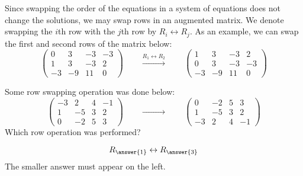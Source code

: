 \documentclass{ximera}
\begin{document}
Since swapping the order of the equations in a
system of equations does not change the solutions, we may swap rows
in an augmented matrix. We denote swapping the $i$th row with the
$j$th row by $R_i\leftrightarrow R_j$. As an example, we can swap
the first and second rows of the matrix below:
\[
  \left(
    \begin{array}{ccc|c}
      0 &   3 & -3 & -3 \\
      1 &   3 & -3 & 2  \\
      -3& -9  & 11 & 0
    \end{array}
  \right)
  \qquad
  \xrightarrow{R_1 \leftrightarrow R_2}
  \qquad
  \left(
    \begin{array}{ccc|c}
      1 &   3 & -3 & 2  \\
      0 &   3 & -3 & -3 \\
      -3& -9  & 11 & 0
    \end{array}
  \right)
\]

\begin{question}
  Some row swapping operation was done below:
  \[
    \begin{pmatrix}
      -3 & 2 & 4 & -1 \\
      1 & -5 & 3 & 2 \\
      0 & -2 & 5 & 3
    \end{pmatrix}
    \qquad\xrightarrow{\phantom{R_1 \leftrightarrow R_3}}\qquad
    \begin{pmatrix}
      0 & -2 & 5 & 3 \\
      1 & -5 & 3 & 2 \\
      -3 & 2 & 4 & -1
    \end{pmatrix}
  \]
  Which row operation was performed?
  \begin{prompt}
    \[
      R_{\answer{1}} \leftrightarrow R_{\answer{3}}
    \]
    The smaller answer must appear on the left.
  \end{prompt}
\end{question}
\end{document}
